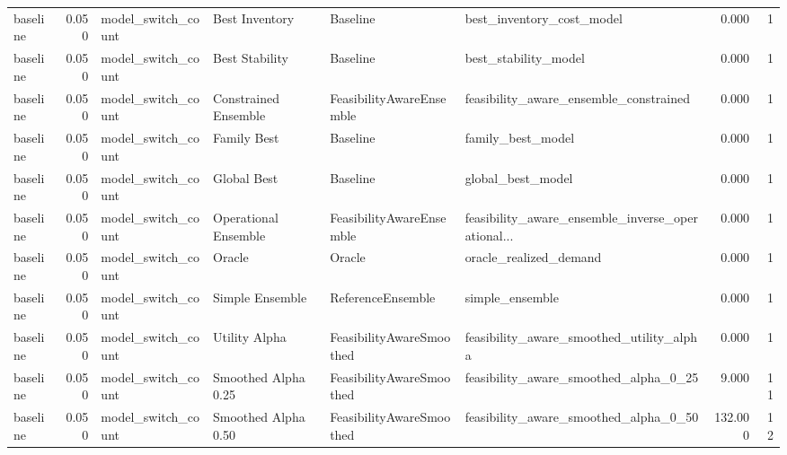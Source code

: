 \begin{table}
{\begin{tabular}{lrllllrr}
      baseline &             0.050 &          model\_switch\_count &        Best Inventory &                  Baseline &                          best\_inventory\_cost\_model &         0.000 &               1 \\
      baseline &             0.050 &          model\_switch\_count &        Best Stability &                  Baseline &                               best\_stability\_model &         0.000 &               1 \\
      baseline &             0.050 &          model\_switch\_count &  Constrained Ensemble &  FeasibilityAwareEnsemble &             feasibility\_aware\_ensemble\_constrained &         0.000 &               1 \\
      baseline &             0.050 &          model\_switch\_count &           Family Best &                  Baseline &                                  family\_best\_model &         0.000 &               1 \\
      baseline &             0.050 &          model\_switch\_count &           Global Best &                  Baseline &                                  global\_best\_model &         0.000 &               1 \\
      baseline &             0.050 &          model\_switch\_count &  Operational Ensemble &  FeasibilityAwareEnsemble &  feasibility\_aware\_ensemble\_inverse\_operational... &         0.000 &               1 \\
      baseline &             0.050 &          model\_switch\_count &                Oracle &                    Oracle &                             oracle\_realized\_demand &         0.000 &               1 \\
      baseline &             0.050 &          model\_switch\_count &       Simple Ensemble &         ReferenceEnsemble &                                    simple\_ensemble &         0.000 &               1 \\
      baseline &             0.050 &          model\_switch\_count &         Utility Alpha &  FeasibilityAwareSmoothed &           feasibility\_aware\_smoothed\_utility\_alpha &         0.000 &               1 \\
      baseline &             0.050 &          model\_switch\_count &   Smoothed Alpha 0.25 &  FeasibilityAwareSmoothed &              feasibility\_aware\_smoothed\_alpha\_0\_25 &         9.000 &              11 \\
      baseline &             0.050 &          model\_switch\_count &   Smoothed Alpha 0.50 &  FeasibilityAwareSmoothed &              feasibility\_aware\_smoothed\_alpha\_0\_50 &       132.000 &              12 \\

\end{tabular}}
\end{table}
